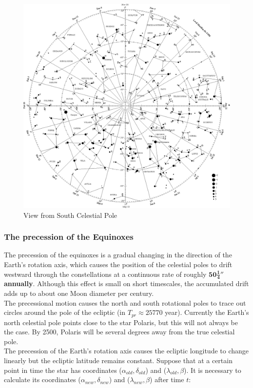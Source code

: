 \documentclass[a4paper,12pt]{extarticle}
\begin{document}
\begin{figure}[H]
    \centering
    \includegraphics[width=0.9 \linewidth]{scp_view.eps}
    \caption{View from South Celestial Pole}
\end{figure}

\subsubsection{The precession of the Equinoxes}

The precession of the equinoxes is a gradual changing in the direction of the Earth’s rotation axis, which causes the position of the celestial poles to drift westward through the constellations at a continuous rate of roughly \textbf{$\mathbf{50\frac{1}{4}''}$ annually}. Although this effect is small on short timescales, the accumulated drift adds up to about one Moon diameter per century.\\

The precessional motion causes the north and south rotational poles
to trace out circles around the pole of the ecliptic (in $T_{pr}\approx 25770$ year). Currently the Earth’s north celestial pole points close to the star Polaris, but this will not always be the case. By 2500, Polaris will be several degrees away from the true celestial pole.\\

The precession of the Earth's rotation axis causes the ecliptic longitude to change linearly but the ecliptic latitude remains constant. Suppose that at a certain point in time the star has coordinates ($\alpha_{old}, \delta_{old}$) and ($\lambda_{old}, \beta$). It is necessary to calculate its coordinates ($\alpha_{new}, \delta_{new}$) and ($\lambda_{new}, \beta$) after time $t$: 
\end{document}
